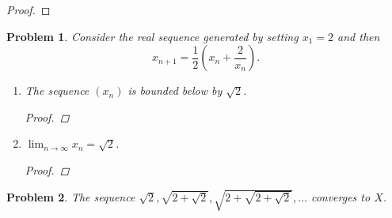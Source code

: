 \documentclass[12pt]{article}
\newtheorem{problem}{Problem}
\begin{document}

\begin{proof}
\end{proof}


\begin{problem} %
Consider the real sequence generated by setting $x_1=2$ and then
	$$x_{n+1} = \frac{1}{2}\left(x_n + \frac{2}{x_n}\right).$$

%

\renewcommand{\labelenumi}{(\alph{enumi})}
\begin{enumerate}
\item The sequence $(x_n)$ is bounded below by $\sqrt{2}$.

\begin{proof}
\end{proof}

\item $\lim_{n\to\infty} x_n = \sqrt{2}$.

\begin{proof}
\end{proof}

\end{enumerate}
\end{problem}


\begin{problem} %
The sequence $\displaystyle \sqrt{2}, \sqrt{2+\sqrt{2}}, \sqrt{2 + \sqrt{2+\sqrt{2}}}, \dots$ converges to $X$.
\end{problem}
\end{document}
